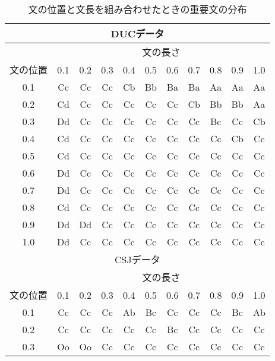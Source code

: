 \begin{table}[tb]\small
\caption{文の位置と文長を組み合わせたときの重要文の分布}
\label{table:diagram_pst_len}
\begin{center}
\begin{tabular}{c|cccccccccc} \hline \hline
\multicolumn{11}{c}{DUCデータ} \\ \hline
 & \multicolumn{10}{c}{文の長さ} \\ \cline{2-11}
文の位置 & 0.1 & 0.2 & 0.3 & 0.4 & 0.5 & 0.6 & 0.7 & 0.8 & 0.9 & 1.0 \\ \hline
0.1                    & Cc  & Cc  & Cc  & Cb  & Bb  & Ba  & Ba  & Aa  & Aa  & Aa  \\       
0.2                    & Cd  & Cc  & Cc  & Cc  & Cc  & Cc  & Cb  & Bb  & Bb  & Aa  \\       
0.3                    & Dd  & Cc  & Cc  & Cc  & Cc  & Cc  & Cc  & Bc  & Cc  & Cb  \\       
0.4                    & Cd  & Cc  & Cc  & Cc  & Cc  & Cc  & Cc  & Cc  & Cb  & Cc  \\       
0.5                    & Cd  & Cc  & Cc  & Cc  & Cc  & Cc  & Cc  & Cc  & Cc  & Cc  \\       
0.6                    & Dd  & Cc  & Cc  & Cc  & Cc  & Cc  & Cc  & Cc  & Cc  & Cc  \\       
0.7                    & Dd  & Cc  & Cc  & Cc  & Cc  & Cc  & Cc  & Cc  & Cc  & Cc  \\       
0.8                    & Cd  & Cc  & Cc  & Cc  & Cc  & Cc  & Cc  & Cc  & Cc  & Cc  \\       
0.9                    & Dd  & Dd  & Cc  & Cc  & Cc  & Cc  & Cc  & Cc  & Cc  & Cc  \\       
1.0                    & Dd  & Cc  & Cc  & Cc  & Cc  & Cc  & Cc  & Cc  & Cc  & Cc  \\       
\hline \hline 
\multicolumn{11}{c}{CSJデータ} \\ \hline
 & \multicolumn{10}{c}{文の長さ} \\ \cline{2-11}
文の位置 & 0.1 & 0.2 & 0.3 & 0.4 & 0.5 & 0.6 & 0.7 & 0.8 & 0.9 & 1.0 \\ \hline
0.1                    & Cc  & Cc  & Cc  & Ab  & Bc  & Cc  & Cc  & Cc  & Bc  & Ab  \\       
0.2                    & Cc  & Cc  & Cc  & Cc  & Cc  & Bc  & Cc  & Cc  & Cc  & Cc  \\       
0.3                    & Oo  & Oo  & Cc  & Cc  & Cc  & Cc  & Cc  & Cc  & Cc  & Cc  \\       

\end{tabular}
\end{center}
\end{table}
